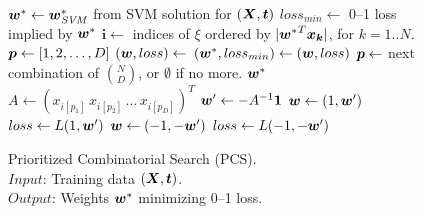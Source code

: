 \begin{figure}[tp!]
\vspace{-3mm}
\caption{
Prioritized Combinatorial Search (PCS).\hfill\; \\
\text{\hspace{1.4cm}} $Input$: Training data $(\boldsymbol{X},\boldsymbol{t})$. \\
\text{\hspace{1.4cm}} $Output$: Weights $\boldsymbol{w}^*$ minimizing 0--1 loss.
}
\label{alg:cs.prioritized}
{\footnotesize 
\begin{algorithmic}[1]
 
\State $\boldsymbol{w}^* \gets \boldsymbol{w}^*_{\mathit{SVM}}$ from SVM solution for $(\boldsymbol{X},\boldsymbol{t})$
\State $loss_{min} \gets$ 0--1 loss implied by $\boldsymbol{w}^*$
\State $\boldsymbol{i} \gets$ indices of $\xi$ ordered by $|{\boldsymbol{w}^*}^T\boldsymbol{x_k}|$, for $k=1..N$.
\State $\boldsymbol{p} \gets [1,2,\dots,D]$
\While{$\p \not= \emptyset$}
   \State $(\boldsymbol{w},loss) \gets$ 
      \State $(\boldsymbol{w}^*, loss_{min}) \gets (\boldsymbol{w}, loss)$
   \EndIf
   \State $\boldsymbol{p} \gets $ next combination of ${N \choose D}$, or $\emptyset$ if no more.
\EndWhile
\State \Return $\boldsymbol{w}^*$
\Statex
{} 
   \State $A \gets (x_{i[p_1]} \, x_{i[p_2]} \, \dots \, x_{i[p_D]})^T$
   \State $\boldsymbol{w}' \gets -A^{-1} \boldsymbol{1}$
      \State $\boldsymbol{w} \gets (1, \boldsymbol{w}')$
      \State $loss \gets L(1,\boldsymbol{w}')$
   \Else
      \State $\boldsymbol{w} \gets (-1, -\boldsymbol{w}')$
      \State $loss \gets L(-1,-\boldsymbol{w}')$
   \EndIf
   \State {} 
\EndFunction
\Statex
\EndFunction
\end{algorithmic}}
\vspace{-4mm}
\end{figure}

\COMMENT

